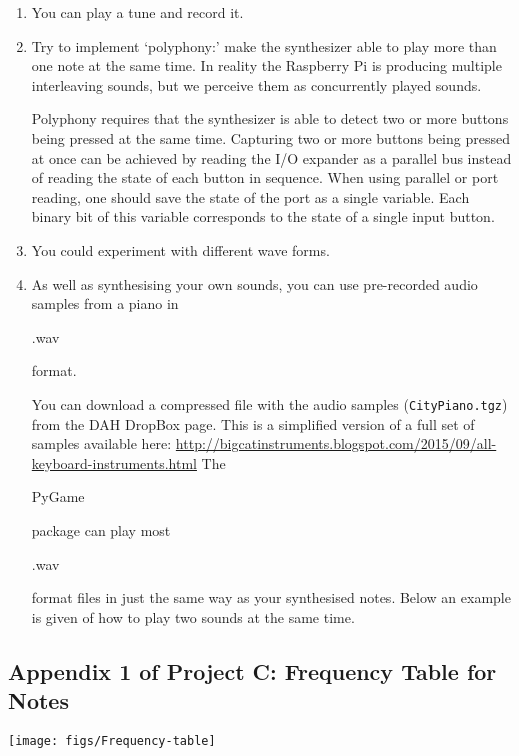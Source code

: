 \begin{enumerate}
\item	You can play a tune and record it.

\item Try to implement `polyphony:' make the synthesizer able to play more than one note at the same time.
In reality the Raspberry Pi is producing multiple interleaving sounds, but we perceive them as concurrently played sounds.

Polyphony requires that the synthesizer is able to detect two or more buttons being pressed at the same time.
Capturing two or more buttons being pressed at once can be achieved by reading the I/O expander as a parallel bus instead of reading the state of each button in sequence.
When using parallel or port reading, one should save the state of the port as a single variable.
Each binary bit of this variable corresponds to the state of a single input button.

\item You could experiment with different wave forms.

\item As well as synthesising your own sounds, you can use pre-recorded audio samples from a piano in \begin{tt}.wav\end{tt} format.

You can download a compressed file with the audio samples (\texttt{CityPiano.tgz}) from the DAH DropBox page.
This is a simplified version of a full set of samples available here: \url{http://bigcatinstruments.blogspot.com/2015/09/all-keyboard-instruments.html}
The \begin{tt}PyGame\end{tt} package can play most \begin{tt}.wav\end{tt} format files in just the same way as your synthesised notes.
Below an example is given of how to play two sounds at the same time. \\


\vspace*{-0.5cm}
\end{enumerate}



\vfill

\subsection*{Appendix 1 of Project C: Frequency Table for Notes}
\vspace*{-1.0cm}
\begin{center}                                        
 {\texttt{[image: figs/Frequency-table]}}
 \end{center}
 
